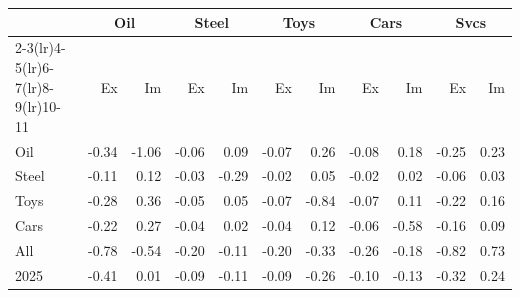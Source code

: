 \begin{tabular}{lrrrrrrrrrr}
\toprule
 & \multicolumn{2}{c}{Oil} & \multicolumn{2}{c}{Steel} & \multicolumn{2}{c}{Toys} & \multicolumn{2}{c}{Cars} & \multicolumn{2}{c}{Svcs} \\
\cmidrule(lr){2-3}\cmidrule(lr){4-5}\cmidrule(lr){6-7}\cmidrule(lr){8-9}\cmidrule(lr){10-11}
 & Ex & Im & Ex & Im & Ex & Im & Ex & Im & Ex & Im \\
\midrule
Oil & -0.34 & -1.06 & -0.06 & 0.09 & -0.07 & 0.26 & -0.08 & 0.18 & -0.25 & 0.23 \\
Steel & -0.11 & 0.12 & -0.03 & -0.29 & -0.02 & 0.05 & -0.02 & 0.02 & -0.06 & 0.03 \\
Toys & -0.28 & 0.36 & -0.05 & 0.05 & -0.07 & -0.84 & -0.07 & 0.11 & -0.22 & 0.16 \\
Cars & -0.22 & 0.27 & -0.04 & 0.02 & -0.04 & 0.12 & -0.06 & -0.58 & -0.16 & 0.09 \\
All & -0.78 & -0.54 & -0.20 & -0.11 & -0.20 & -0.33 & -0.26 & -0.18 & -0.82 & 0.73 \\
2025 & -0.41 & 0.01 & -0.09 & -0.11 & -0.09 & -0.26 & -0.10 & -0.13 & -0.32 & 0.24 \\
\bottomrule
\end{tabular}
